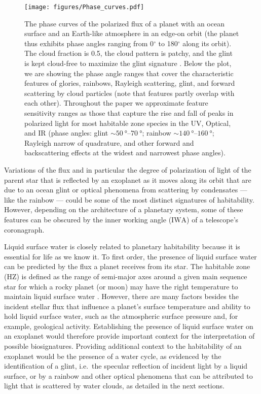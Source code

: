 \documentclass[
    usenatbib,
]{mnras}
\newcommand{\IWA}{\ensuremath{\mathrm{IWA}}}
\begin{document}
\begin{figure}
    \centering
    \texttt{[image: figures/Phase\_curves.pdf]}
    \caption{The phase curves of the polarized flux of a planet with an ocean surface and an Earth-like atmosphere in an edge-on orbit (the planet thus exhibits phase angles ranging from 0$^\circ$ to 180$^\circ$ along its orbit). The cloud fraction is 0.5, the cloud pattern is patchy, and the glint is kept cloud-free to maximize the glint signature \citep[see ][]{treesandstam2019}.
        Below the plot, we are showing the phase angle ranges that cover the
        characteristic features of glories, rainbows, Rayleigh scattering, glint, and forward scattering by cloud particles (note that features partly overlap
        with each other).  
        Throughout the paper we approximate feature sensitivity ranges as those that capture the rise and fall of peaks in polarized light for most habitable zone species in the UV, Optical, and IR (phase angles: glint $\sim\qtyrange{50}{70}{\degree}$; rainbow $\sim\SIrange{140}{160}{\degree}$; Rayleigh narrow of quadrature, and other forward and backscattering effects at the widest and narrowest phase angles).
    }
    \label{fig:bottplot}
\end{figure}



Variations of the flux and in particular the degree of polarization of
light of the parent star that is reflected by an exoplanet as it moves
along its orbit that are due to an ocean glint or optical phenomena from scattering by condensates --- like the rainbow --- could be some of the most distinct signatures of habitability.
%
However, depending on the architecture of a planetary system, some of these features can be obscured by the inner working angle (\IWA{}) of a telescope's coronagraph.

Liquid surface water is closely related to planetary habitability because it is essential for life as we know it.
%
To first order, the presence of liquid surface water can be predicted by the flux a planet receives from its star.
%
The habitable zone (HZ) is defined as the range of semi-major axes around a given main sequence star for which a rocky planet (or moon) may have the right temperature to maintain liquid surface water \citep{kasting93}. 
%
However, there are many factors besides the incident stellar flux that influence a planet's surface temperature and ability to hold liquid surface water, such as the atmospheric surface pressure and, for example, geological activity. 
%
Establishing the presence of liquid surface water on an exoplanet would therefore provide important context for the interpretation of possible biosignatures.
%
Providing additional context to the habitability of an exoplanet would be the presence of a water cycle, as evidenced by the identification of a glint, i.e.\ the specular reflection of incident light by a liquid surface, or by a rainbow and other optical phenomena that can be attributed to light that is scattered by water clouds, as detailed in the next sections.
\end{document}
